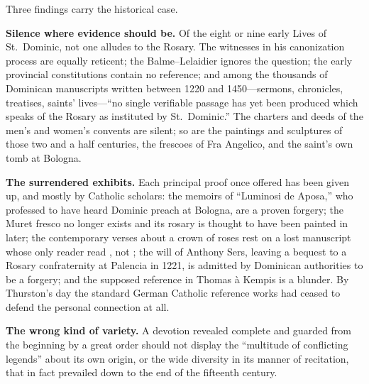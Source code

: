 Three findings carry the historical case.

\textbf{Silence where evidence should be.} Of the eight or nine early
Lives of St.~Dominic, not one alludes to the Rosary. The witnesses in his
canonization process are equally reticent; the Balme--Lelaidier
 ignores the question; the early
provincial constitutions contain no reference; and among the thousands
of Dominican manuscripts written between 1220 and 1450---sermons,
chronicles, treatises, saints' lives---``no single verifiable passage
has yet been produced which speaks of the Rosary as instituted by
St.~Dominic.'' The charters and deeds of the men's and women's convents
are silent; so are the paintings and sculptures of those two and a half
centuries, the frescoes of Fra Angelico, and the saint's own tomb at
Bologna.

\textbf{The surrendered exhibits.} Each principal proof once offered has
been given up, and mostly by Catholic scholars: the memoirs of
``Luminosi de Aposa,'' who professed to have heard Dominic preach at
Bologna, are a proven forgery; the Muret fresco no longer exists and its
rosary is thought to have been painted in later; the contemporary verses
about a crown of roses rest on a lost manuscript whose only reader read
, not ; the will of Anthony Sers, leaving a
bequest to a Rosary confraternity at Palencia in 1221, is admitted by
Dominican authorities to be a forgery; and the supposed reference in
Thomas \`a Kempis is a blunder. By Thurston's day the standard German
Catholic reference works had ceased to defend the personal connection at
all.

\textbf{The wrong kind of variety.} A devotion revealed complete and
guarded from the beginning by a great order should not display the
``multitude of conflicting legends'' about its own origin, or the wide
diversity in its manner of recitation, that in fact prevailed down to the
end of the fifteenth century.

